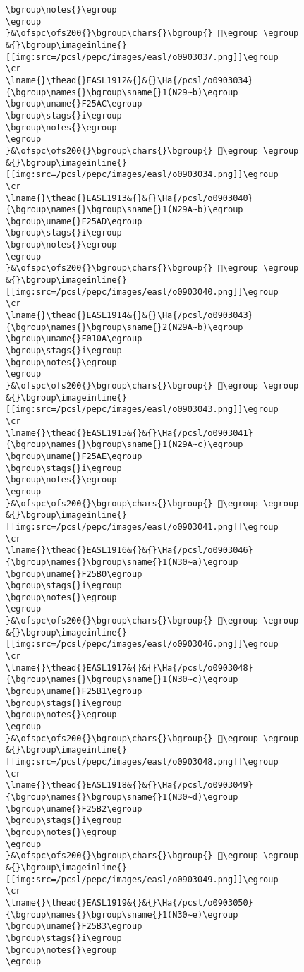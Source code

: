 \begin{verbatim}
\bgroup\notes{}\egroup
\egroup
}&\ofspc\ofs200{}\bgroup\chars{}\bgroup{} 󰄇\egroup \egroup
&{}\bgroup\imageinline{}[[img:src=/pcsl/pepc/images/easl/o0903037.png]]\egroup
\cr
\lname{}\thead{}EASL1912&{}&{}\Ha{/pcsl/o0903034}{\bgroup\names{}\bgroup\sname{}1(N29∼b)\egroup
\bgroup\uname{}F25AC\egroup
\bgroup\stags{}i\egroup
\bgroup\notes{}\egroup
\egroup
}&\ofspc\ofs200{}\bgroup\chars{}\bgroup{} 󲖬\egroup \egroup
&{}\bgroup\imageinline{}[[img:src=/pcsl/pepc/images/easl/o0903034.png]]\egroup
\cr
\lname{}\thead{}EASL1913&{}&{}\Ha{/pcsl/o0903040}{\bgroup\names{}\bgroup\sname{}1(N29A∼b)\egroup
\bgroup\uname{}F25AD\egroup
\bgroup\stags{}i\egroup
\bgroup\notes{}\egroup
\egroup
}&\ofspc\ofs200{}\bgroup\chars{}\bgroup{} 󲖭\egroup \egroup
&{}\bgroup\imageinline{}[[img:src=/pcsl/pepc/images/easl/o0903040.png]]\egroup
\cr
\lname{}\thead{}EASL1914&{}&{}\Ha{/pcsl/o0903043}{\bgroup\names{}\bgroup\sname{}2(N29A∼b)\egroup
\bgroup\uname{}F010A\egroup
\bgroup\stags{}i\egroup
\bgroup\notes{}\egroup
\egroup
}&\ofspc\ofs200{}\bgroup\chars{}\bgroup{} 󰄊\egroup \egroup
&{}\bgroup\imageinline{}[[img:src=/pcsl/pepc/images/easl/o0903043.png]]\egroup
\cr
\lname{}\thead{}EASL1915&{}&{}\Ha{/pcsl/o0903041}{\bgroup\names{}\bgroup\sname{}1(N29A∼c)\egroup
\bgroup\uname{}F25AE\egroup
\bgroup\stags{}i\egroup
\bgroup\notes{}\egroup
\egroup
}&\ofspc\ofs200{}\bgroup\chars{}\bgroup{} 󲖮\egroup \egroup
&{}\bgroup\imageinline{}[[img:src=/pcsl/pepc/images/easl/o0903041.png]]\egroup
\cr
\lname{}\thead{}EASL1916&{}&{}\Ha{/pcsl/o0903046}{\bgroup\names{}\bgroup\sname{}1(N30∼a)\egroup
\bgroup\uname{}F25B0\egroup
\bgroup\stags{}i\egroup
\bgroup\notes{}\egroup
\egroup
}&\ofspc\ofs200{}\bgroup\chars{}\bgroup{} 󲖰\egroup \egroup
&{}\bgroup\imageinline{}[[img:src=/pcsl/pepc/images/easl/o0903046.png]]\egroup
\cr
\lname{}\thead{}EASL1917&{}&{}\Ha{/pcsl/o0903048}{\bgroup\names{}\bgroup\sname{}1(N30∼c)\egroup
\bgroup\uname{}F25B1\egroup
\bgroup\stags{}i\egroup
\bgroup\notes{}\egroup
\egroup
}&\ofspc\ofs200{}\bgroup\chars{}\bgroup{} 󲖱\egroup \egroup
&{}\bgroup\imageinline{}[[img:src=/pcsl/pepc/images/easl/o0903048.png]]\egroup
\cr
\lname{}\thead{}EASL1918&{}&{}\Ha{/pcsl/o0903049}{\bgroup\names{}\bgroup\sname{}1(N30∼d)\egroup
\bgroup\uname{}F25B2\egroup
\bgroup\stags{}i\egroup
\bgroup\notes{}\egroup
\egroup
}&\ofspc\ofs200{}\bgroup\chars{}\bgroup{} 󲖲\egroup \egroup
&{}\bgroup\imageinline{}[[img:src=/pcsl/pepc/images/easl/o0903049.png]]\egroup
\cr
\lname{}\thead{}EASL1919&{}&{}\Ha{/pcsl/o0903050}{\bgroup\names{}\bgroup\sname{}1(N30∼e)\egroup
\bgroup\uname{}F25B3\egroup
\bgroup\stags{}i\egroup
\bgroup\notes{}\egroup
\egroup

\end{verbatim}
